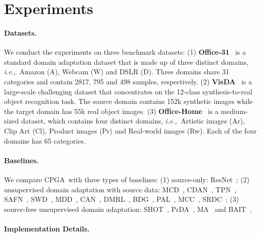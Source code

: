\documentclass{article}
\def\ie{\emph{i.e.,~}}
\def\ournet{CPGA}
\begin{document}
\section{Experiments} 







\paragraph{Datasets.}\label{des:dataset}

We conduct the experiments on three benchmark datasets:
(1) \textbf{Office-31}~\cite{Saenko2010AdaptingVC} is a standard domain adaptation dataset that is made up of three distinct domains, \ie Amazon (A), Webcam (W) and DSLR (D). Three domains share 31 categories and contain 2817, 795 and 498 samples, respectively.
(2) \textbf{VisDA}~\cite{Peng2017VisDATV} is a large-scale challenging dataset that concentrates on the 12-class synthesis-to-real object recognition task. The source domain contains 152k synthetic images
while the target domain has 55k real object images. 
(3) \textbf{Office-Home}~\cite{Venkateswara2017DeepHN} is a medium-sized dataset, which contains four distinct domains, \ie Artistic images (Ar), Clip Art (Cl), Product images (Pr) and Real-world images (Rw). Each of the four domains has 65 categories.




\paragraph{Baselines.}

We compare \ournet~with three types of baselines:
(1) source-only: ResNet~\cite{He2016DeepRL};
(2) unsupervised domain adaptation with source data:
MCD~\cite{saito2018maximum}, CDAN~\cite{long2018conditional}, TPN~\cite{pan2019transferrable}, SAFN~\cite{xu2019larger}, SWD~\cite{lee2019sliced}, MDD~\cite{zhang2019bridging}, CAN~\cite{Kang2019ContrastiveAN}, DMRL~\cite{wu2020dual}, BDG~\cite{yang2020bi}, PAL~\cite{hu2020panda}, MCC~\cite{jin2020minimum}, SRDC~\cite{tang2020unsupervised}; (3) source-free unsupervised domain adaptation: SHOT~\cite{liang2020shot}, PrDA~\cite{kim2020progressive}, MA~\cite{Li2020ModelAU} and BAIT~\cite{Yang2020UnsupervisedDA}.

\paragraph{Implementation Details.}
\end{document}
